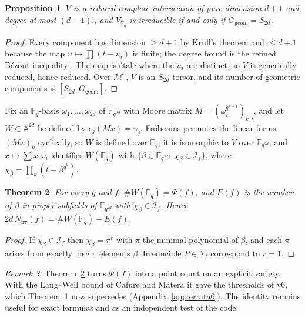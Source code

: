 \documentclass[11pt,a4paper]{article}
\newtheorem{theorem}{Theorem}[section]
\newtheorem{proposition}[theorem]{Proposition}
\theoremstyle{definition}
\theoremstyle{remark}
\newtheorem{remark}[theorem]{Remark}
\newcommand{\Fq}{\mathbb{F}_q}
\newcommand{\Fqbar}{\overline{\mathbb{F}}_q}
\newcommand{\A}{\mathbb{A}}
\newcommand{\Ggeom}{G_{\mathrm{geom}}}
\newcommand{\Nirr}{N_{\mathrm{irr}}}
\newcommand{\cI}{\mathcal{I}}
\newcommand{\cM}{\mathcal{M}}
\begin{document}
\begin{proposition}\label{prop:V}
$V$ is a reduced complete intersection of pure dimension $d+1$ and degree at most $(d-1)!$, and
$V_{\Fqbar}$ is irreducible if and only if $\Ggeom=S_{2d}$.
\end{proposition}

\begin{proof}
Every component has dimension $\ge d+1$ by Krull's theorem and $\le d+1$ because the map
$u\mapsto\prod(t-u_i)$ is finite; the degree bound is the refined Bézout inequality
\cite[Ex.~8.4.6]{Fulton1998}. The map is \'etale where the $u_i$ are distinct, so $V$ is generically
reduced, hence reduced. Over $\cM^\circ$, $V$ is an $S_{2d}$-torsor, and its number of geometric
components is $[S_{2d}:\Ggeom]$.
\end{proof}

Fix an $\Fq$-basis $\omega_1,\dots,\omega_{2d}$ of $\mathbb F_{q^{2d}}$ with Moore matrix
$M=(\omega_i^{q^{k-1}})_{k,i}$, and let $W\subset\A^{2d}$ be defined by $e_j(Mx)=\gamma_j$.
Frobenius permutes the linear forms $(Mx)_k$ cyclically, so $W$ is defined over $\Fq$; it is
isomorphic to $V$ over $\mathbb F_{q^{2d}}$, and $x\mapsto\sum x_i\omega_i$ identifies $W(\Fq)$ with
$\{\beta\in\mathbb F_{q^{2d}}:\ \chi_\beta\in\cI_f\}$, where $\chi_\beta=\prod_k(t-\beta^{q^k})$.

\begin{theorem}\label{thm:identity}
For every $q$ and $f$: $\#W(\Fq)=\Psi(f)$, and $E(f)$ is the number of $\beta$ in proper subfields
of $\mathbb F_{q^{2d}}$ with $\chi_\beta\in\cI_f$. Hence $2d\,\Nirr(f)=\#W(\Fq)-E(f)$.
\end{theorem}

\begin{proof}
If $\chi_\beta\in\cI_f$ then $\chi_\beta=\pi^r$ with $\pi$ the minimal polynomial of $\beta$, and each
$\pi$ arises from exactly $\deg\pi$ elements $\beta$. Irreducible $P\in\cI_f$ correspond to $r=1$.
\end{proof}

\begin{remark}
Theorem~\ref{thm:identity} turns $\Psi(f)$ into a point count on an explicit variety. With the
Lang--Weil bound of Cafure and Matera \cite{CM2006} it gave the thresholds of v6, which
Theorem~1 now supersedes (Appendix~\ref{app:errata6}). The identity remains useful for exact
formulas and as an independent test of the code.
\end{remark}

\end{document}
